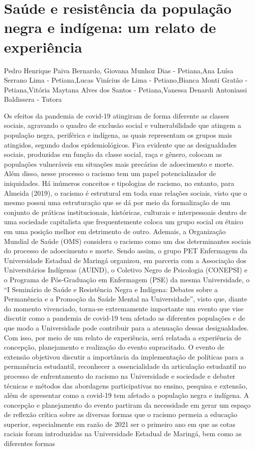

\section{Saúde e resistência da população negra e indígena: um relato de experiência}

Pedro Henrique Paiva Bernardo, Giovana Munhoz Dias - Petiana,Ana Luísa Serrano Lima - Petiana,Lucas Vinícius de Lima - Petiano,Bianca Monti Gratão - Petiana,Vitória Maytana Alves dos Santos - Petiana,Vanessa Denardi Antoniassi Baldissera - Tutora

Os efeitos da pandemia de covid-19 atingiram de forma diferente as classes sociais, agravando o quadro de exclusão social e vulnerabilidade que atingem a população negra, periférica e indígena, as quais representam os grupos mais atingidos, segundo dados epidemiológicos. Fica evidente que as desigualdades sociais, produzidas em função da classe social, raça e gênero, colocam as populações vulneráveis em situações mais precárias de adoecimento e morte. Além disso, nesse processo o racismo tem um papel potencializador de iniquidades. Há inúmeros conceitos e tipologias de racismo, no entanto, para Almeida (2019), o racismo é estrutural em toda suas relações sociais, visto que o mesmo possui uma estruturação que se dá por meio da formalização de um conjunto de práticas institucionais, históricas, culturais e interpessoais dentro de uma sociedade capitalista que frequentemente coloca um grupo social ou étnico em uma posição melhor em detrimento de outro. Ademais, a Organização Mundial de Saúde (OMS) considera o racismo como um dos determinantes sociais do processo de adoecimento e morte. Sendo assim, o grupo PET Enfermagem da Universidade Estadual de Maringá organizou, em parceria com a Associação dos Universitários Indígenas (AUIND), o Coletivo Negro de Psicologia (CONEPSI) e o Programa de Pós-Graduação em Enfermagem (PSE) da mesma Universidade, o “I Seminário de Saúde e Resistência Negra e Indígena: Debates sobre a Permanência e a Promoção da Saúde Mental na Universidade”, visto que, diante do momento vivenciado, torna-se extremamente importante um evento que vise discutir como a pandemia de covid-19 tem afetado as diferentes populações e de que modo a Universidade pode contribuir para a atenuação dessas desigualdades. Com isso, por meio de um relato de experiência, será relatada a experiência de concepção, planejamento e realização do evento supracitado. O evento de extensão objetivou discutir a importância da implementação de políticas para a permanência estudantil, reconhecer a essencialidade da articulação estudantil no processo de enfrentamento do racismo na Universidade e sociedade e debater técnicas e métodos das abordagens participativas no ensino, pesquisa e extensão, além de apresentar como a covid-19 tem afetado a população negra e indígena. A concepção e planejamento do evento partiram da necessidade em gerar um espaço de reflexão crítica sobre as diversas formas que o racismo permeia a educação superior, especialmente em razão de 2021 ser o primeiro ano em que as cotas raciais foram introduzidas na Universidade Estadual de Maringá, bem como as diferentes formas 